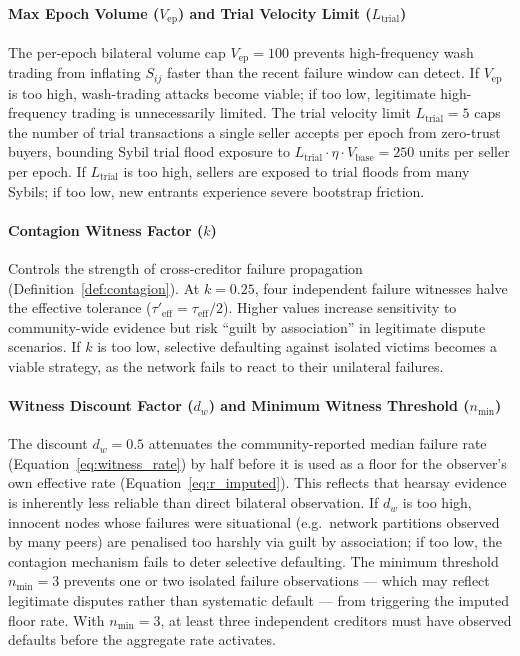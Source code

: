 \documentclass[11pt]{article}
\begin{document}
\paragraph{Max Epoch Volume ($V_{\text{ep}}$) and Trial Velocity Limit ($L_{\text{trial}}$)}
The per-epoch bilateral volume cap $V_{\text{ep}} = 100$ prevents high-frequency wash trading from inflating $S_{ij}$ faster than the recent failure window can detect. If $V_{\text{ep}}$ is too high, wash-trading attacks become viable; if too low, legitimate high-frequency trading is unnecessarily limited. The trial velocity limit $L_{\text{trial}} = 5$ caps the number of trial transactions a single seller accepts per epoch from zero-trust buyers, bounding Sybil trial flood exposure to $L_{\text{trial}} \cdot \eta \cdot V_{\text{base}} = 250$ units per seller per epoch. If $L_{\text{trial}}$ is too high, sellers are exposed to trial floods from many Sybils; if too low, new entrants experience severe bootstrap friction.

\paragraph{Contagion Witness Factor ($k$)}
Controls the strength of cross-creditor failure propagation (Definition~\ref{def:contagion}). At $k = 0.25$, four independent failure witnesses halve the effective tolerance ($\tau'_{\text{eff}} = \tau_{\text{eff}} / 2$). Higher values increase sensitivity to community-wide evidence but risk ``guilt by association'' in legitimate dispute scenarios. If $k$ is too low, selective defaulting against isolated victims becomes a viable strategy, as the network fails to react to their unilateral failures.

\paragraph{Witness Discount Factor ($d_w$) and Minimum Witness Threshold ($n_{\min}$)}
The discount $d_w = 0.5$ attenuates the community-reported median failure rate (Equation~\ref{eq:witness_rate}) by half before it is used as a floor for the observer's own effective rate (Equation~\ref{eq:r_imputed}). This reflects that hearsay evidence is inherently less reliable than direct bilateral observation. If $d_w$ is too high, innocent nodes whose failures were situational (e.g.\ network partitions observed by many peers) are penalised too harshly via guilt by association; if too low, the contagion mechanism fails to deter selective defaulting. The minimum threshold $n_{\min} = 3$ prevents one or two isolated failure observations --- which may reflect legitimate disputes rather than systematic default --- from triggering the imputed floor rate. With $n_{\min} = 3$, at least three independent creditors must have observed defaults before the aggregate rate activates.
\end{document}
